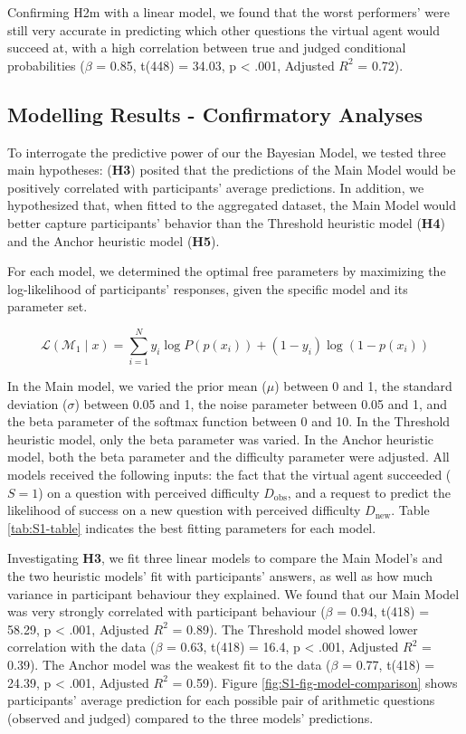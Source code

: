 \documentclass[
  10pt,
  letterpaper]{article}
\begin{document}
Confirming H2m with a linear model, we found that the worst performers' were still very accurate in predicting which other questions the virtual agent would succeed at, with a high correlation between true and judged conditional probabilities (\(\beta\) = 0.85, t(448) = 34.03, p \textless{} .001, Adjusted \(R^2\) = 0.72).

\subsection{Modelling Results - Confirmatory Analyses}\label{modelling-results---confirmatory-analyses}

To interrogate the predictive power of our the Bayesian Model, we tested three main hypotheses: (\textbf{H3}) posited that the predictions of the Main Model would be positively correlated with participants' average predictions. In addition, we hypothesized that, when fitted to the aggregated dataset, the Main Model would better capture participants' behavior than the Threshold heuristic model (\textbf{H4}) and the Anchor heuristic model (\textbf{H5}).

For each model, we determined the optimal free parameters by maximizing the log-likelihood of participants' responses, given the specific model and its parameter set.

\[
\mathcal{L}(\mathcal{M}_1 \mid x) = \sum_{i=1}^{N} y_i \log  P(p(x_i)) + (1 - y_i) \log (1- p(x_i))
\]

In the Main model, we varied the prior mean (\(\mu\)) between 0 and 1, the standard deviation (\(\sigma\)) between 0.05 and 1, the noise parameter between 0.05 and 1, and the beta parameter of the softmax function between 0 and 10. In the Threshold heuristic model, only the beta parameter was varied. In the Anchor heuristic model, both the beta parameter and the difficulty parameter were adjusted. All models received the following inputs: the fact that the virtual agent succeeded (\(S = 1\)) on a question with perceived difficulty \(D_{\text{obs}}\), and a request to predict the likelihood of success on a new question with perceived difficulty \(D_{\text{new}}\). Table \ref{tab:S1-table} indicates the best fitting parameters for each model.

Investigating \textbf{H3}, we fit three linear models to compare the Main Model's and the two heuristic models' fit with participants' answers, as well as how much variance in participant behaviour they explained. We found that our Main Model was very strongly correlated with participant behaviour (\(\beta\) = 0.94, t(418) = 58.29, p \textless{} .001, Adjusted \(R^2\) = 0.89). The Threshold model showed lower correlation with the data (\(\beta\) = 0.63, t(418) = 16.4, p \textless{} .001, Adjusted \(R^2\) = 0.39). The Anchor model was the weakest fit to the data (\(\beta\) = 0.77, t(418) = 24.39, p \textless{} .001, Adjusted \(R^2\) = 0.59). Figure \ref{fig:S1-fig-model-comparison} shows participants' average prediction for each possible pair of arithmetic questions (observed and judged) compared to the three models' predictions.
\end{document}
